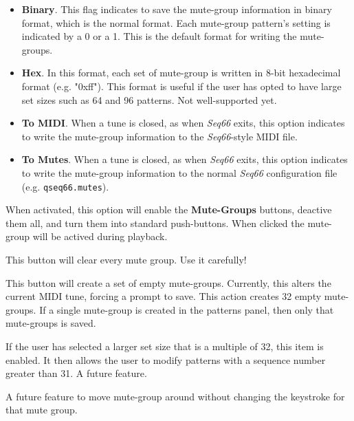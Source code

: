       \begin{itemize}
         \item \textbf{Binary}.
            This flag indicates to save the mute-group information in
            binary format, which is the normal format.
            Each mute-group pattern's setting is indicated by a 0 or a 1.
            This is the default format for writing the mute-groups.
         \item \textbf{Hex}.
            In this format, each set of mute-group is written in 8-bit hexadecimal
            format (e.g. "0xff").  This format is useful if the user has opted to
            have large set sizes such as 64 and 96 patterns.  Not well-supported
            yet.
         \item \textbf{To MIDI}.
            When a tune is closed, as when \textsl{Seq66} exits, this option
            indicates to write the mute-group information to the
            \textsl{Seq66}-style MIDI file.
         \item \textbf{To Mutes}.
            When a tune is closed, as when \textsl{Seq66} exits, this option
            indicates to write the mute-group information to the normal
            \textsl{Seq66} configuration file (e.g. \texttt{qseq66.mutes}).
      \end{itemize}

      When activated, this option will enable the \textbf{Mute-Groups} buttons,
      deactive them all, and turn them into standard push-buttons.  When clicked
      the mute-group will be actived during playback.

      This button will clear every mute group. Use it carefully!

      This button will create a set of empty mute-groups.
      Currently, this alters the current MIDI tune, forcing a prompt to save.
      This action creates 32 empty mute-groups.
      If a single mute-group is created in the patterns panel,
      then only that mute-groups is saved.


      If the user has selected a larger set size that is a multiple of 32, this
      item is enabled.  It then allows the user to modify patterns with a
      sequence number greater than 31.  A future feature.

      A future feature to move mute-group around without
      changing the keystroke for that mute group.

